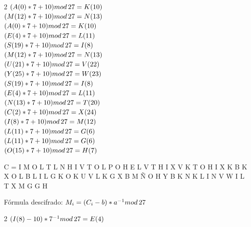\documentclass{article}
\begin{document}
\begin{enumerate}
\begin{multicols}{2}
 $(A(0)*7+10)mod \thinspace 27 = K (10)$\\
 $(M(12)*7+10)mod \thinspace 27 = N (13)$\\
 $(A(0)*7+10)mod \thinspace 27 = K (10)$\\
 $(E(4)*7+10)mod \thinspace 27 = L (11)$\\
 $(S(19)*7+10)mod \thinspace 27 = I (8)$\\
 $(M(12)*7+10)mod \thinspace 27 = N (13)$\\
 $(U(21)*7+10)mod \thinspace 27 = V (22)$\\
 $(Y(25)*7+10)mod \thinspace 27 = W (23)$\\
 $(S(19)*7+10)mod \thinspace 27 = I (8)$\\
 $(E(4)*7+10)mod \thinspace 27 = L (11)$\\
 $(N(13)*7+10)mod \thinspace 27 = T (20)$\\
 $(C(2)*7+10)mod \thinspace 27 = X (24)$\\
 $(I(8)*7+10)mod \thinspace 27 = M (12)$\\
 $(L(11)*7+10)mod \thinspace 27 = G (6)$\\
 $(L(11)*7+10)mod \thinspace 27 = G (6)$\\
 $(O(15)*7+10)mod \thinspace 27 = H (7)$\\
 
 \end{multicols}
 
 
 C = I M O L T L N H I V T O L P O H E L V T H I X V K T O H I X K B K X O L B L I L G K O K U V L K G X B M Ñ O H Y B K N K L I N V W I L T X M G G H
 
 Fórmula descifrado:  $M_i=(C_i-b)*a^{-1} mod \thinspace 27$

\begin{multicols}{2}
$(I(8)-10)*7^{-1} mod \thinspace 27= E (4) $ \\

\end{multicols}



\end{enumerate}
\end{document}
